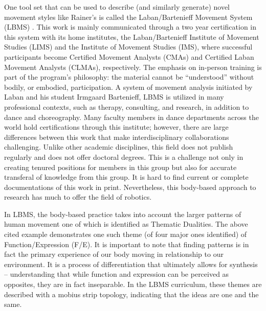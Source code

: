 \documentclass[arts,article,submit,moreauthors,pdftex,10pt,a4paper]{mdpi}
\begin{document}
One tool set that can be used to describe (and similarly generate) novel movement styles like Rainer's is called the Laban/Bartenieff Movement System (LBMS) \cite{laban1971mastery,laban2,laban0,laban1966choreutics,bartenieff1980body,hackney1998making,studd2013}.  This work is mainly communicated through a two year certification in this system with its home institutes, the Laban/Bartenieff Institute of Movement Studies (LIMS) and the Institute of Movement Studies (IMS), where successful participants become Certified Movement Analysts (CMAs) and Certified Laban Movement Analysts (CLMAs), respectively.  The emphasis on in-person training is part of the program's philosophy: the material cannot be ``understood'' without bodily, or embodied, participation.
A system of movement analysis initiated by Laban and his student Irmgaard Bartenieff, LBMS is utilized in many professional contexts, such as therapy, consulting, and research, in addition to dance and choreography. 
 Many faculty members in dance departments across the world hold certifications through this institute; however, there are large differences between this work that make interdisciplinary collaborations challenging.  Unlike other academic disciplines, this field does not publish regularly \cite{groves2007talking} and does not offer doctoral degrees.  This is a challenge not only in creating tenured positions for members in this group but also for accurate transferal of knowledge from this group.  It is hard to find current or complete documentations of this work in print.  %
Nevertheless, this body-based approach to research has much to offer the field of robotics. %

In LBMS, the body-based practice takes into account the larger patterns of human movement one of which is identified as Thematic Dualities. The above cited example demonstrates one such theme (of four major ones identified) of Function/Expression (F/E). It is important to note that finding patterns is in fact the primary experience of our body moving in relationship to our environment. It is a process of differentiation that ultimately allows for synthesis -- understanding that while function and expression can be perceived as opposites, they are in fact inseparable.  In the LBMS curriculum, these themes are described with a mobius strip topology, indicating that the ideas are one and the same.  
\end{document}

